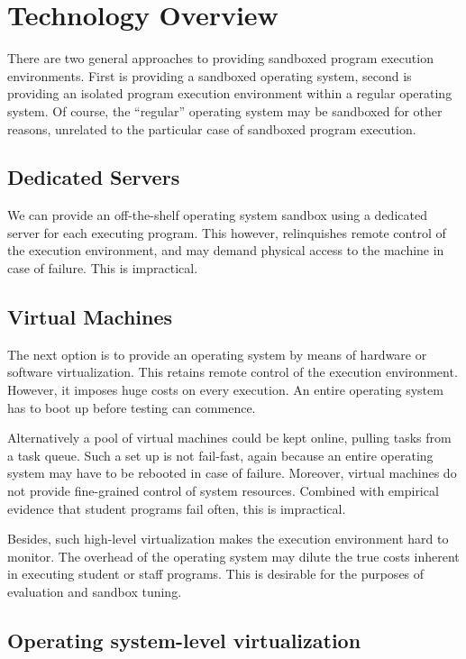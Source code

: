 
\section{Technology Overview}

There are two general approaches to providing sandboxed program execution
environments. First is providing a sandboxed operating system, second is
providing an isolated program execution environment within a regular operating
system. Of course, the ``regular'' operating system may be sandboxed for other
reasons, unrelated to the particular case of sandboxed program execution.

\subsection{Dedicated Servers}

We can provide an off-the-shelf operating system sandbox using a dedicated
server for each executing program. This however, relinquishes remote control of
the execution environment, and may demand physical access to the machine in
case of failure. This is impractical.

\subsection{Virtual Machines}

The next option is to provide an operating system by means of hardware or
software virtualization. This retains remote control of the execution
environment. However, it imposes huge costs on every execution. An entire
operating system has to boot up before testing can commence.

Alternatively a pool of virtual machines could be kept online, pulling tasks
from a task queue. Such a set up is not fail-fast, again because an entire
operating system may have to be rebooted in case of failure. Moreover, virtual
machines do not provide fine-grained control of system resources. Combined with
empirical evidence that student programs fail often, this is impractical.

Besides, such high-level virtualization makes the execution environment hard to
monitor. The overhead of the operating system may dilute the true costs
inherent in executing student or staff programs. This is desirable for the
purposes of evaluation and sandbox tuning.

\subsection{Operating system-level virtualization}

